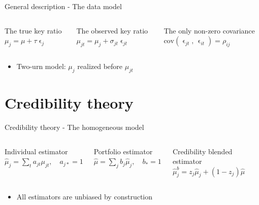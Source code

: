 \documentclass{beamer}
\begin{document}


\begin{frame}{General description - The data model} 


\begin{columns}
    \begin{block}{The true key ratio}
   $\mu_j = \mu + \tau\upvarepsilon_j$
    \end{block}
   \begin{block}{The observed key ratio}
   $\mu_{jt} = \mu_j + \sigma_{jt}\upvarepsilon_{jt}$
    \end{block}
    \begin{block}{The only non-zero covariance}
        $\text{cov}(\upvarepsilon_{jt},\, \upvarepsilon_{it}) = \rho_{ij}$
    \end{block}
\end{columns}

\vspace{0.5cm}

\begin{itemize}
    \item Two-urn model: $\mu_j$ realized before $\mu_{jt}$
\end{itemize}

\end{frame}

% 

\section{Credibility theory}

\begin{frame}{Credibility theory - The homogeneous model}

\begin{columns}
    \begin{block}{Individual estimator}
   $\hat\mu_j = \sum_t a_{jt}\mu_{jt}, \quad a_{j\ast}=1$
    \end{block}
    \begin{block}{Portfolio estimator}
   $\hat\mu = \sum_j b_j\hat\mu_j, \quad b_{\ast} = 1$
    \end{block}
    \begin{block}{Credibility blended estimator}
   $\hat\mu_j^b = z_j \hat\mu_j + (1-z_j)\hat\mu$
    \end{block}
\end{columns}

\vspace{0.5cm}

\begin{itemize}
    \item All estimators are unbiased by construction
\end{itemize}
    
\end{frame}
\end{document}
